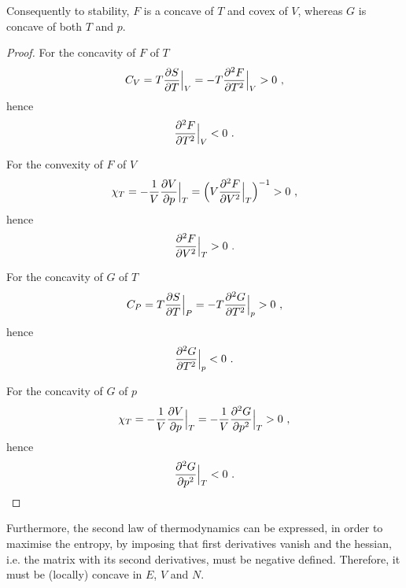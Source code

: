     Consequently to stability, $F$ is a concave of $T$ and covex of $V$, whereas $G$ is concave of both $T$ and $p$. 
    \begin{proof}
        For the concavity of $F$ of $T$
        \begin{equation*}
            C_V = T \frac{\partial S}{\partial T} \Big \vert_{V} = - T \frac{\partial^2 F}{\partial T^2} \Big \vert_V > 0 ~,
        \end{equation*}
        hence 
        \begin{equation*}
            \frac{\partial^2 F}{\partial T^2} \Big \vert_V < 0 ~.
        \end{equation*}

        For the convexity of $F$ of $V$
        \begin{equation*}
            \chi_T = - \frac{1}{V} \frac{\partial V}{\partial p} \Big \vert_T = \Big ( V \frac{\partial^2 F}{\partial V^2} \Big \vert_T \Big)^{-1} > 0 ~,
        \end{equation*}
        hence 
        \begin{equation*}
            \frac{\partial^2 F}{\partial V^2} \Big \vert_T > 0 ~.
        \end{equation*}

        For the concavity of $G$ of $T$
        \begin{equation*}
            C_P = T \frac{\partial S}{\partial T} \Big \vert_{P} = - T \frac{\partial^2 G}{\partial T^2} \Big \vert_p > 0 ~,
        \end{equation*}
        hence 
        \begin{equation*}
            \frac{\partial^2 G}{\partial T^2} \Big \vert_p < 0 ~.
        \end{equation*}

        For the concavity of $G$ of $p$
        \begin{equation*}
            \chi_T = - \frac{1}{V} \frac{\partial V}{\partial p} \Big \vert_T = - \frac{1}{V} \frac{\partial^2 G}{\partial p^2} \Big \vert_T > 0 ~,
        \end{equation*}
        hence 
        \begin{equation*}
            \frac{\partial^2 G}{\partial p^2} \Big \vert_T < 0 ~.
        \end{equation*}
    \end{proof}

    Furthermore, the second law of thermodynamics can be expressed, in order to maximise the entropy, by imposing that first derivatives vanish and the hessian, i.e. the matrix with its second derivatives, must be negative defined. Therefore, it must be (locally) concave in $E$, $V$ and $N$.

